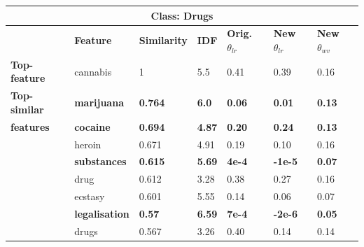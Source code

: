 \begin{table}[htbp]
\centering
\begin{tabular}{lllllll}
\multicolumn{7}{c}{\textbf{Class: Drugs}} \\ \hline
\multicolumn{1}{l|}{\textbf{}} & \multicolumn{1}{l|}{\textbf{Feature}} & \multicolumn{1}{l|}{\textbf{Similarity}} & \multicolumn{1}{l|}{\textbf{IDF}} & \multicolumn{1}{l|}{\textbf{Orig. $\theta_{lr}$}} & \multicolumn{1}{l|}{\textbf{New $\theta_{lr}$}} & \textbf{New $\theta_{wv}$} \\ \hline
\multicolumn{1}{l|}{\textbf{Top-feature}} & \multicolumn{1}{l|}{cannabis} & \multicolumn{1}{l|}{1} & \multicolumn{1}{l|}{5.5} & \multicolumn{1}{l|}{0.41} & \multicolumn{1}{l|}{0.39} & 0.16 \\ \hline
\multicolumn{1}{l|}{\textbf{Top-similar}} & \multicolumn{1}{l|}{\textbf{marijuana}} & \multicolumn{1}{l|}{\textbf{0.764}} & \multicolumn{1}{l|}{\textbf{6.0}} & \multicolumn{1}{l|}{\textbf{0.06}} & \multicolumn{1}{l|}{\textbf{0.01}} & \textbf{0.13} \\
\multicolumn{1}{l|}{\textbf{features}} & \multicolumn{1}{l|}{\textbf{cocaine}} & \multicolumn{1}{l|}{\textbf{0.694}} & \multicolumn{1}{l|}{\textbf{4.87}} & \multicolumn{1}{l|}{\textbf{0.20}} & \multicolumn{1}{l|}{\textbf{0.24}} & \textbf{0.13} \\
\multicolumn{1}{l|}{} & \multicolumn{1}{l|}{heroin} & \multicolumn{1}{l|}{0.671} & \multicolumn{1}{l|}{4.91} & \multicolumn{1}{l|}{0.19} & \multicolumn{1}{l|}{0.10} & 0.16 \\
\multicolumn{1}{l|}{\textbf{}} & \multicolumn{1}{l|}{\textbf{substances}} & \multicolumn{1}{l|}{\textbf{0.615}} & \multicolumn{1}{l|}{\textbf{5.69}} & \multicolumn{1}{l|}{\textbf{4e-4}} & \multicolumn{1}{l|}{\textbf{-1e-5}} & \textbf{0.07} \\
\multicolumn{1}{l|}{} & \multicolumn{1}{l|}{drug} & \multicolumn{1}{l|}{0.612} & \multicolumn{1}{l|}{3.28} & \multicolumn{1}{l|}{0.38} & \multicolumn{1}{l|}{0.27} & 0.16 \\
\multicolumn{1}{l|}{} & \multicolumn{1}{l|}{ecstasy} & \multicolumn{1}{l|}{0.601} & \multicolumn{1}{l|}{5.55} & \multicolumn{1}{l|}{0.14} & \multicolumn{1}{l|}{0.06} & 0.07 \\
\multicolumn{1}{l|}{\textbf{}} & \multicolumn{1}{l|}{\textbf{legalisation}} & \multicolumn{1}{l|}{\textbf{0.57}} & \multicolumn{1}{l|}{\textbf{6.59}} & \multicolumn{1}{l|}{\textbf{7e-4}} & \multicolumn{1}{l|}{\textbf{-2e-6}} & \textbf{0.05} \\
\multicolumn{1}{l|}{} & \multicolumn{1}{l|}{drugs} & \multicolumn{1}{l|}{0.567} & \multicolumn{1}{l|}{3.26} & \multicolumn{1}{l|}{0.40} & \multicolumn{1}{l|}{0.14} & 0.14 \\

\end{tabular}
\end{table}
